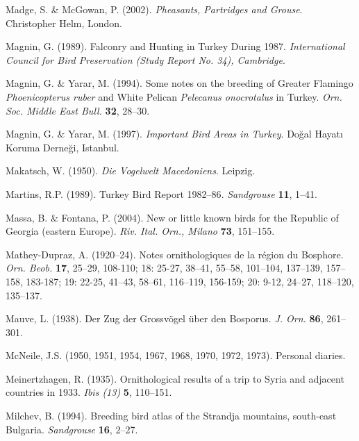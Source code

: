 \documentclass[
  a4paper,
  DIV=11,
  numbers=noendperiod]{scrreprt}
\newlength{\cslhangindent}
\newenvironment{CSLReferences}[2] %
 {\begin{list}{}{%
  \setlength{\itemindent}{0pt}
  \setlength{\leftmargin}{0pt}
  \setlength{\parsep}{0pt}
  \ifodd #1
   \setlength{\leftmargin}{\cslhangindent}
   \setlength{\itemindent}{-1\cslhangindent}
  \fi
  \setlength{\itemsep}{#2\baselineskip}}}
 {\end{list}}
\begin{document}
\begin{CSLReferences}{1}{1}
Madge, S. \& McGowan, P. (2002). \emph{{Pheasants, Partridges and
Grouse}}. Christopher Helm, London.

Magnin, G. (1989). {Falconry and Hunting in Turkey During 1987}.
\emph{International Council for Bird Preservation (Study Report No. 34),
Cambridge}.

Magnin, G. \& Yarar, M. (1994). {Some notes on the breeding of Greater
Flamingo \emph{Phoenicopterus ruber} and White Pelican \emph{Pelecanus
onocrotalus} in Turkey}. \emph{Orn. Soc. Middle East Bull.} \textbf{32},
28--30.

Magnin, G. \& Yarar, M. (1997). \emph{{Important Bird Areas in Turkey}}.
Doğal Hayatı Koruma Derneği, Istanbul.

Makatsch, W. (1950). \emph{{Die Vogelwelt Macedoniens}}. Leipzig.

Martins, R.P. (1989). {Turkey Bird Report 1982--86}. \emph{Sandgrouse}
\textbf{11}, 1--41.

Massa, B. \& Fontana, P. (2004). {New or little known birds for the
Republic of Georgia (eastern Europe)}. \emph{Riv. Ital. Orn., Milano}
\textbf{73}, 151--155.

Mathey-Dupraz, A. (1920--24). {Notes ornithologiques de la région du
Bosphore}. \emph{Orn. Beob.} \textbf{17}, 25--29, 108-110; 18: 25-27,
38--41, 55--58, 101--104, 137--139, 157--158, 183-187; 19: 22-25,
41--43, 58--61, 116--119, 156-159; 20: 9-12, 24--27, 118--120, 135--137.

Mauve, L. (1938). {Der Zug der Grossvögel über den Bosporus}. \emph{J.
Orn.} \textbf{86}, 261--301.

McNeile, J.S. (1950, 1951, 1954, 1967, 1968, 1970, 1972, 1973).
{Personal diaries}.

Meinertzhagen, R. (1935). {Ornithological results of a trip to Syria and
adjacent countries in 1933}. \emph{Ibis (13)} \textbf{5}, 110--151.

Milchev, B. (1994). {Breeding bird atlas of the Strandja mountains,
south-east Bulgaria}. \emph{Sandgrouse} \textbf{16}, 2--27.


\end{CSLReferences}
\end{document}
